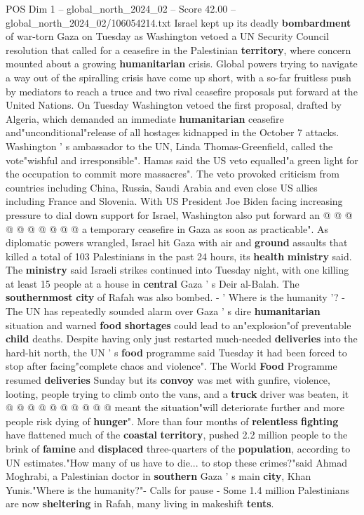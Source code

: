 \begin{textsample}{POS Dim 1 – global\_north\_2024\_02 – Score 42.00 – global\_north\_2024\_02/106054214.txt}  \label{ex:f1_pos_099}
Israel kept up its deadly \textbf{bombardment} of war-torn Gaza on Tuesday as Washington vetoed a UN Security Council resolution that called for a ceasefire in the Palestinian \textbf{territory}, where concern mounted about a growing \textbf{humanitarian} crisis.
Global powers trying to navigate a way out of the spiralling crisis have come up short, with a so-far fruitless push by mediators to reach a truce and two rival ceasefire proposals put forward at the United Nations.
On Tuesday Washington vetoed the first proposal, drafted by Algeria, which demanded an immediate \textbf{humanitarian} ceasefire and"unconditional"release of all hostages kidnapped in the October 7 attacks.
Washington ' s ambassador to the UN, Linda Thomas-Greenfield, called the vote"wishful and irresponsible".
Hamas said the US veto equalled"a green light for the occupation to commit more massacres".
The veto provoked criticism from countries including China, Russia, Saudi Arabia and even close US allies including France and Slovenia.
With US President Joe Biden facing increasing pressure to dial down support for Israel, Washington also put forward an @ @ @ @ @ @ @ @ @ @ a temporary ceasefire in Gaza as soon as practicable".
As diplomatic powers wrangled, Israel hit Gaza with air and \textbf{ground} assaults that killed a total of 103 Palestinians in the past 24 hours, its \textbf{health} \textbf{ministry} said.
The \textbf{ministry} said Israeli strikes continued into Tuesday night, with one killing at least 15 people at a house in \textbf{central} Gaza ' s Deir al-Balah.
The \textbf{southernmost} \textbf{city} of Rafah was also bombed. - ' Where is the humanity '? - The UN has repeatedly sounded alarm over Gaza ' s dire \textbf{humanitarian} situation and warned \textbf{food} \textbf{shortages} could lead to an"explosion"of preventable \textbf{child} deaths.
Despite having only just restarted much-needed \textbf{deliveries} into the hard-hit north, the UN ' s \textbf{food} programme said Tuesday it had been forced to stop after facing"complete chaos and violence".
The World \textbf{Food} Programme resumed \textbf{deliveries} Sunday but its \textbf{convoy} was met with gunfire, violence, looting, people trying to climb onto the vans, and a \textbf{truck} driver was beaten, it @ @ @ @ @ @ @ @ @ @ meant the situation"will deteriorate further and more people risk dying of \textbf{hunger}".
More than four months of \textbf{relentless} \textbf{fighting} have flattened much of the \textbf{coastal} \textbf{territory}, pushed 2.2 million people to the brink of \textbf{famine} and \textbf{displaced} three-quarters of the \textbf{population}, according to UN estimates."How many of us have to die... to stop these crimes?"said Ahmad Moghrabi, a Palestinian doctor in \textbf{southern} Gaza ' s main \textbf{city}, Khan Yunis."Where is the humanity?"- Calls for pause - Some 1.4 million Palestinians are now \textbf{sheltering} in Rafah, many living in makeshift \textbf{tents}.

\end{textsample}
